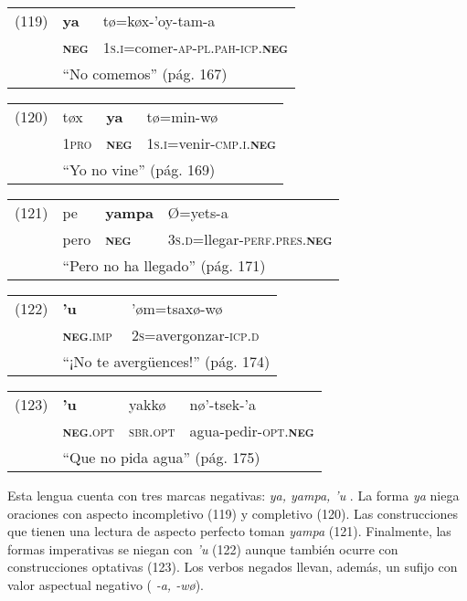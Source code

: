 {\setmainfont{Charis SIL}

\begin{tabular}{lll}
(119) & \textbf{ya} & tø=køx-’oy-tam-a \\
& \textsc{\textbf{neg}} & \textsc{1s.i}=comer-\textsc{ap-pl.pah-icp.\textbf{neg}} \\
& \multicolumn{2}{l}{``No comemos'' (pág. 167)} 
\end{tabular} \vspace{0.5cm}

\begin{tabular}{llll}
(120) & tøx & \textbf{ya} & tø=min-wø \\
& \textsc{1pro} & \textsc{\textbf{neg}} & \textsc{1s.i}=venir-\textsc{cmp.i.\textbf{neg}} \\
& \multicolumn{3}{l}{``Yo no vine'' (pág. 169)}
\end{tabular} \vspace{0.5cm}

\begin{tabular}{llll}
(121) & pe & \textbf{yampa} & Ø=yets-a \\
& pero & \textsc{\textbf{neg}} & \textsc{3s.d}=llegar-\textsc{perf.pres.\textbf{neg}}\\
& \multicolumn{3}{l}{``Pero no ha llegado'' (pág. 171)}
\end{tabular} \vspace{0.5cm}

\begin{tabular}{lll}
(122) & \textbf{’u} & ’øm=tsaxø-wø \\
& \textsc{\textbf{neg}.imp} & \textsc{2s}=avergonzar-\textsc{icp.d} \\
& \multicolumn{2}{l}{``¡No te avergüences!'' (pág. 174)}
\end{tabular} \vspace{0.5cm}

\begin{tabular}{llll}
(123) & \textbf{’u} & yakkø & nø’-tsek-’a \\
& \textsc{\textbf{neg}.opt} & \textsc{sbr.opt} & agua-pedir-\textsc{opt.\textbf{neg}} \\
& \multicolumn{3}{l}{``Que no pida agua'' (pág. 175)}
\end{tabular} \vspace{0.5cm}

}

Esta lengua cuenta con tres marcas negativas: {\setmainfont{Charis SIL} \textit{ya, yampa, 'u}} \textcolor{MidnightBlue}{\citep{zoque}}. La forma {\setmainfont{Charis SIL} \textit{ya}} niega oraciones con aspecto incompletivo (119) y completivo (120). Las construcciones que tienen una lectura de aspecto perfecto toman {\setmainfont{Charis SIL} \textit{yampa}} (121). Finalmente, las formas imperativas se niegan con {\setmainfont{Charis SIL} \textit{'u}} (122) aunque también ocurre con construcciones optativas (123). Los verbos negados llevan, además, un sufijo con valor aspectual negativo ({\setmainfont{Charis SIL} \textit{-a, -wø}}).